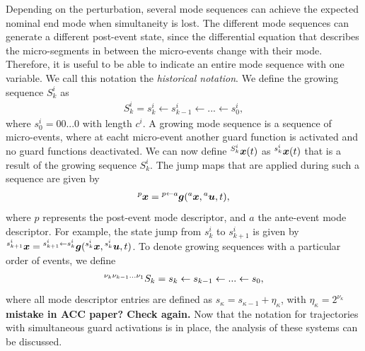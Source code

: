 \documentclass[../DC2017114Bouma.tex]{subfiles}
\begin{document}
Depending on the perturbation, several mode sequences can achieve the expected nominal end mode when simultaneity is lost. The different mode sequences can generate a different post-event state, since the differential equation that describes the micro-segments in between the micro-events change with their mode. Therefore, it is useful to be able to indicate an entire mode sequence with one variable. We call this notation the \textit{historical notation}. We define the growing sequence $S_k^i$ as 
\begin{align}
S_k^i = s_k^i\leftarrow s_{k-1}^i\leftarrow ... \leftarrow s_0^i,
\end{align}
where $s_0^i = 00...0$ with length $c^i$. A growing mode sequence is a sequence of micro-events, where at eacht micro-event another guard function is activated and no guard functions deactivated. We can now define $^{S_k^i}{\boldsymbol{x}}(t)$ as $^{s_k^i}{\boldsymbol{x}}(t)$ that is a result of the growing sequence $S_k^i$. The jump maps that are applied during such a sequence are given by
\begin{align}
\hspace{0cm}^{p}{\boldsymbol{x}} = \hspace{0cm}^{p\leftarrow a}{\boldsymbol{g}}(\hspace{0cm}^{a}{\boldsymbol{x}},\hspace{0cm}^{a}{\boldsymbol{u}},t),
\end{align}
where $p$ represents the post-event mode descriptor, and $a$ the ante-event mode descriptor. For example, the state jump from $s^i_k$ to $s^i_{k+1}$ is given by $\hspace{0cm}^{s^i_{k+1}}{\boldsymbol{x}} = \hspace{0cm}^{s^i_{k+1}\leftarrow s^i_k}{\boldsymbol{g}}(\hspace{0cm}^{s^i_k}{\boldsymbol{x}},\hspace{0cm}^{s^i_k}{\boldsymbol{u}},t)$. To denote growing sequences with a particular order of events, we define
\begin{align}
\hspace{0cm}^{\nu_k \nu_{k-1}...\nu_1}S_k = s_k \leftarrow s_{k-1} \leftarrow ... \leftarrow s_0,
\end{align}
where all mode descriptor entries are defined as $s_{\kappa} = s_{\kappa-1} + \eta_{\kappa}$, with $\eta_{\kappa} = 2^{\nu_{\kappa}}$ \textbf{mistake in ACC paper? Check again.}
Now that the notation for trajectories with simultaneous guard activations is in place, the analysis of these systems can be discussed.

%
\end{document}
